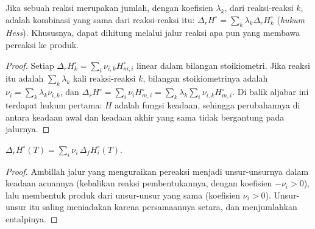 \begin{theorem}\label{thm:b2:reaction-enthalpy:hess}
Jika sebuah reaksi merupakan jumlah, dengan koefisien $\lambda_k$, dari
reaksi-reaksi $k$,  adalah kombinasi yang sama
dari  reaksi-reaksi itu:
$\Delta_r H^\circ = \sum_k\lambda_k\Delta_r H_k^\circ$
(\emph{hukum Hess}). Khususnya, 
dapat dihitung melalui jalur reaksi apa pun yang membawa pereaksi ke
produk.
\end{theorem}

\begin{proof}
Setiap $\Delta_r H_k^\circ = \sum_i\nu_{i,k}H_{m,i}^\circ$ linear dalam
bilangan stoikiometri. Jika reaksi itu adalah $\sum_k\lambda_k$ kali
reaksi-reaksi $k$, bilangan stoikiometrinya adalah $\nu_i = \sum_k\lambda_k
\nu_{i,k}$, dan $\Delta_r H^\circ = \sum_i\nu_iH_{m,i}^\circ = \sum_k\lambda_k
\sum_i\nu_{i,k}H_{m,i}^\circ$. Di balik aljabar ini terdapat hukum pertama:
$H$ adalah fungsi keadaan, sehingga perubahannya di antara keadaan awal
dan keadaan akhir yang sama tidak bergantung pada jalurnya.
\end{proof}

\begin{proposition}\label{prop:b2:reaction-enthalpy:formation-sum}
$\Delta_r H^\circ(T) = \sum_i\nu_i\,\Delta_f H_i^\circ(T)$.
\end{proposition}

\begin{proof}
Ambillah jalur yang menguraikan pereaksi menjadi unsur-unsurnya dalam
keadaan acuannya (kebalikan reaksi pembentukannya, dengan koefisien
$-\nu_i > 0$), lalu membentuk produk dari unsur-unsur yang sama (koefisien
$\nu_i > 0$). Unsur-unsur itu saling meniadakan karena persamaannya
setara, dan  menjumlahkan entalpinya.
\end{proof}

